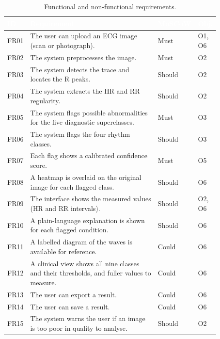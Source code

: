 \begin{table}[!htbp]
  \centering
  \footnotesize
  \setlength{\arrayrulewidth}{0.8pt}      %
  \renewcommand{\arraystretch}{1.05}      %
  \caption{Functional and non-functional requirements.}
  \label{tab:functional-req}
  \begin{tabular}{|p{0.08\linewidth}|p{0.60\linewidth}|p{0.105\linewidth}|p{0.085\linewidth}|}
    \hline
    \rowcolor{cyan!90!black}
    \textcolor{white}{\textbf{ID}} & \textcolor{white}{\textbf{Requirement}} &
    \textcolor{white}{\textbf{MoSCoW}} & \textcolor{white}{\textbf{Obj.}} \\
    \hline
    FR01 & The user can upload an ECG image (scan or photograph). & Must & O1, O6 \\
    \hline
    FR02 & The system preprocesses the image. & Must & O2 \\
    \hline
    FR03 & The system detects the trace and locates the R peaks. & Should & O2 \\
    \hline
    FR04 & The system extracts the HR and RR regularity. & Should & O2 \\
    \hline
    FR05 & The system flags possible abnormalities for the five diagnostic superclasses. & Must & O3 \\
    \hline
    FR06 & The system flags the four rhythm classes. & Should & O3 \\
    \hline
    FR07 & Each flag shows a calibrated confidence score. & Must & O5 \\
    \hline
    FR08 & A heatmap is overlaid on the original image for each flagged class. & Should & O6 \\
    \hline
    FR09 & The interface shows the measured values (HR and RR intervals). & Should & O2, O6 \\
    \hline
    FR10 & A plain-language explanation is shown for each flagged condition. & Should & O6 \\
    \hline
    FR11 & A labelled diagram of the waves is available for reference. & Could & O6 \\
    \hline
    FR12 & A clinical view shows all nine classes and their thresholds, and fuller values to measure. & Could & O6 \\
    \hline
    FR13 & The user can export a result. & Could & O6 \\
    \hline
    FR14 & The user can save a result. & Could & O6 \\
    \hline
    FR15 & The system warns the user if an image is too poor in quality to analyse. & Should & O2 \\

\end{tabular}
\end{table}

